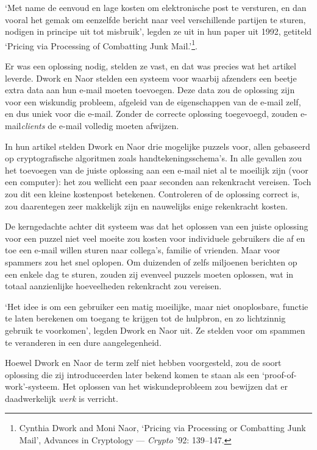 \documentclass[smalldemyvopaper,11pt,twoside,onecolumn,openright,extrafontsizes,hidelinks]{memoir}
\begin{document}
`Met name de eenvoud en lage kosten om elektronische post te versturen,
en dan vooral het gemak om eenzelfde bericht naar veel verschillende
partijen te sturen, nodigen in principe uit tot misbruik', legden ze uit
in hun paper uit 1992, getiteld `Pricing via Processing of Combatting
Junk Mail.'\footnote{Cynthia Dwork and Moni Naor, `Pricing via
  Processing or Combatting Junk Mail', Advances in Cryptology ---
  \emph{Crypto} '92: 139--147.}.

Er was een oplossing nodig, stelden ze vast, en dat was precies wat het
artikel leverde. Dwork en Naor stelden een systeem voor waarbij
afzenders een beetje extra data aan hun e-mail moeten toevoegen. Deze
data zou de oplossing zijn voor een wiskundig probleem, afgeleid van de
eigenschappen van de e-mail zelf, en dus uniek voor die e-mail. Zonder
de correcte oplossing toegevoegd, zouden e-mail\emph{clients} de e-mail
volledig moeten afwijzen.

In hun artikel stelden Dwork en Naor drie mogelijke puzzels voor, allen
gebaseerd op cryptografische algoritmen zoals handtekeningsschema's. In
alle gevallen zou het toevoegen van de juiste oplossing aan een e-mail
niet al te moeilijk zijn (voor een computer): het zou wellicht een paar
seconden aan rekenkracht vereisen. Toch zou dit een kleine kostenpost
betekenen. Controleren of de oplossing correct is, zou daarentegen zeer
makkelijk zijn en nauwelijks enige rekenkracht kosten.

De kerngedachte achter dit systeem was dat het oplossen van een juiste
oplossing voor een puzzel niet veel moeite zou kosten voor individuele
gebruikers die af en toe een e-mail willen sturen naar collega's,
familie of vrienden. Maar voor spammers zou het snel oplopen. Om
duizenden of zelfs miljoenen berichten op een enkele dag te sturen,
zouden zij evenveel puzzels moeten oplossen, wat in totaal aanzienlijke
hoeveelheden rekenkracht zou vereisen.

`Het idee is om een gebruiker een matig moeilijke, maar niet
onoplosbare, functie te laten berekenen om toegang te krijgen tot de
hulpbron, en zo lichtzinnig gebruik te voorkomen', legden Dwork en Naor
uit. Ze stelden voor om spammen te veranderen in een dure
aangelegenheid.

Hoewel Dwork en Naor de term zelf niet hebben voorgesteld, zou de soort
oplossing die zij introduceerden later bekend komen te staan als een
`proof-of-work'-systeem. Het oplossen van het wiskundeprobleem zou
bewijzen dat er daadwerkelijk \emph{werk} is verricht.
\end{document}
